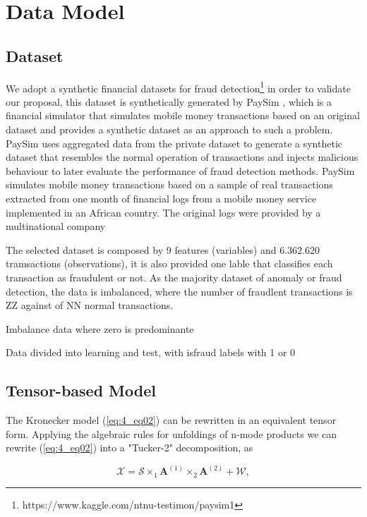 \section{Data Model}
\label{sec:4_datamodel}

\subsection{Dataset}
\label{sec:4_dataset}

We adopt a synthetic financial datasets for fraud detection\footnote{https://www.kaggle.com/ntnu-testimon/paysim1} in order to validate our proposal, this dataset is synthetically generated by  PaySim \cite{lopez2016paysim} , which is a financial simulator that simulates mobile money transactions based on an original dataset and provides a synthetic dataset as an approach to such a problem. PaySim uses aggregated data from the private dataset to generate a synthetic dataset that resembles the normal operation of transactions and injects malicious behaviour to later evaluate the performance of fraud detection methods. PaySim simulates mobile money transactions based on a sample of real transactions extracted from one month of financial logs from a mobile money service implemented in an African country. The original logs were provided by a multinational company

The selected dataset is composed by 9 features (variables) and 6.362.620 tramsactions (observations), it is also provided one lable that classifies each transaction as fraudulent or not. As the majority dataset of anomaly or fraud detection, the data is imbalanced, where the number of fraudlent transactions is ZZ against of NN normal transactions.

Imbalance data where zero is predominante

Data divided into learning and test, with isfraud labels with 1 or 0

\subsection{Tensor-based Model}
\label{sec:4_tensor_model}

The Kronecker model (\ref{eq:4_eq02}) can be rewritten in an equivalent tensor form. Applying the algebraic rules for unfoldings of n-mode products \cite{roemer2014tensor} we can rewrite (\ref{eq:4_eq02}) into a "Tucker-2" decomposition, as

\begin{equation}\label{eq:4_eq04}
\boldsymbol{\mathcal{X}} = \boldsymbol{\mathcal{S}} \times_1 \boldsymbol{A}^{(1)} \times_2 \boldsymbol{A}^{(2)} + \boldsymbol{\mathcal{W}},
\end{equation}

